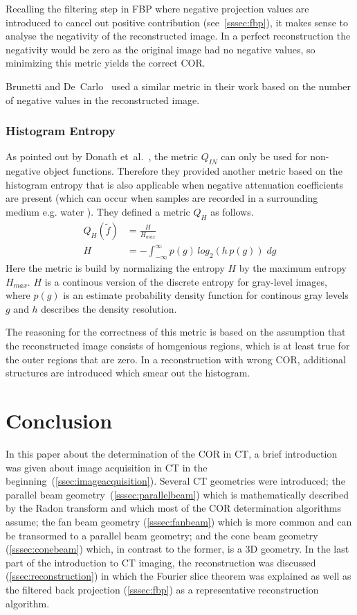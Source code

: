 \documentclass[10pt,journal,compsoc]{IEEEtran}
\begin{document}
Recalling the filtering step in FBP where negative projection values are introduced to cancel out positive contribution (see~\cref{sssec:fbp}), it makes sense to analyse the negativity of the reconstructed image.
In a perfect reconstruction the negativity would be zero as the original image had no negative values, so minimizing this metric yields the correct COR.

Brunetti and De~Carlo~\cite{brunetti2004} used a similar metric in their work based on the number of negative values in the reconstructed image.


\subsubsection{Histogram Entropy}\label{sssec:qh}
As pointed out by Donath et~al.~\cite{donath2006}, the metric $Q_{IN}$ can only be used for non-negative object functions.
Therefore they provided another metric based on the histogram entropy that is also applicable when negative attenuation coefficients are present (which can occur when samples are recorded in a surrounding medium e.g. water \cite{donath2006}).
They defined a metric $Q_H$ as follows.
%
\begin{align}
Q_H(\tilde{f}) &= \frac{H}{H_{max}} 
\\
H &= -\int_{-\infty}^{\infty}p(g)\,log_2(h\,p(g))\;dg
\end{align}
%
Here the metric is build by normalizing the entropy $H$ by the maximum entropy $H_{max}$.
$H$ is a continous version of the discrete entropy for gray-level images, where $p(g)$ is an estimate probability density function for continous gray levels $g$ and $h$ describes the density resolution.

The reasoning for the correctness of this metric is based on the assumption that the reconstructed image consists of homgenious regions, which is at least true for the outer regions that are zero.
In a reconstruction with wrong COR, additional structures are introduced which smear out the histogram.


\section{Conclusion}
In this paper about the determination of the COR in CT, a brief introduction was given about image acquisition in CT in the beginning~(\cref{ssec:imageacquisition}).
Several CT geometries were introduced; 
the parallel beam geometry~(\cref{sssec:parallelbeam}) which is mathematically described by the Radon transform and which most of the COR determination algorithms assume;
the fan beam geometry (\cref{sssec:fanbeam}) which is more common and can be transormed to a parallel beam geometry;
and the cone beam geometry (\cref{sssec:conebeam}) which, in contrast to the former, is a 3D geometry.
In the last part of the introduction to CT imaging, the reconstruction was discussed (\cref{ssec:reconstruction}) in which the Fourier slice theorem was explained as well as the filtered back projection (\cref{sssec:fbp}) as a representative reconstruction algorithm.
\end{document}
